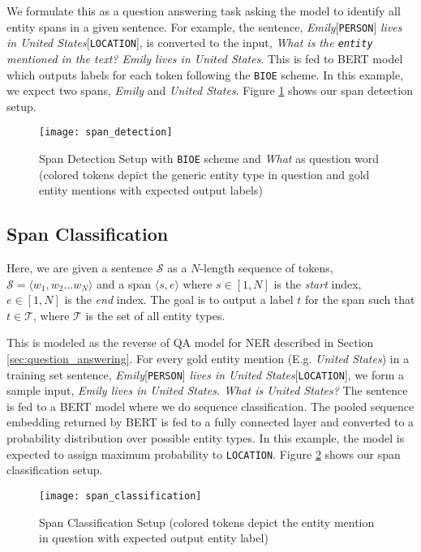 \documentclass[11pt]{article}
\begin{document}
We formulate this as a question answering task asking the model to identify all entity spans in a given sentence. For example, the sentence, \textit{Emily}[\texttt{PERSON}] \textit{lives in United States}[\texttt{LOCATION}], is converted to the input, \textit{What is the \texttt{entity} mentioned in the text? Emily lives in United States}. This is fed to BERT model which outputs labels for each token following the \texttt{BIOE} scheme. In this example, we expect two spans, \textit{Emily} and \textit{United States}. Figure \ref{fig:span_detection} shows our span detection setup.

\begin{figure}
    \centering
    \texttt{[image: span\_detection]}
    \caption{Span Detection Setup with \texttt{BIOE} scheme and \textit{What} as question word (colored tokens depict the generic entity type in question and gold entity mentions with expected output labels)}
    \label{fig:span_detection}
\end{figure}

\subsection{Span Classification}
Here, we are given a sentence $\mathcal{S}$ as a $N$-length sequence of tokens, $\mathcal{S} = \langle w_1, w_2 \ldots w_N \rangle$ and a span $\langle s, e\rangle$ where $s \in [1, N]$ is the \textit{start} index, $e \in [1, N]$ is the \textit{end} index. The goal is to output a label $t$ for the span such that $t \in \mathcal{T}$, where $\mathcal{T}$ is the set of all entity types.

This is modeled as the reverse of QA model for NER described in Section \ref{sec:question_answering}. For every gold entity mention (E.g. \textit{United States}) in a training set sentence, \textit{Emily}[\texttt{PERSON}] \textit{lives in United States}[\texttt{LOCATION}], we form a sample input, \textit{Emily lives in United States. What is United States?} The sentence is fed to a BERT model where we do sequence classification. The pooled sequence embedding returned by BERT is fed to a fully connected layer and converted to a probability distribution over possible entity types. In this example, the model is expected to assign maximum probability to \texttt{LOCATION}. Figure \ref{fig:span_classification} shows our span classification setup.

\begin{figure}[h!]
    \centering
    \texttt{[image: span\_classification]}
    \caption{Span Classification Setup (colored tokens depict the entity mention in question with expected output entity label)}
    \label{fig:span_classification}
\end{figure}
\end{document}
